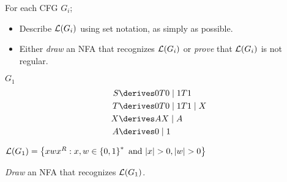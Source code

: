 \begin{problem}
  For each CFG $G_i$;
  \begin{itemize}
    \item Describe $\mathcal{L}(G_i)$ using set notation, as simply as possible.
    \item Either \emph{draw} an NFA that recognizes $\mathcal{L}(G_i)$ or
      \emph{prove} that $\mathcal{L}(G_i)$ is not regular.
  \end{itemize}

  \begin{enumalph}
    \item $G_1$
      \begin{align*}
        S &\derives 0T0 \mid 1T1 \\
        T &\derives 0T0 \mid 1T1 \mid X \\
        X &\derives AX \mid A \\
        A &\derives 0 \mid 1
      \end{align*}
      \begin{Answer}
        \begin{enumroman}
          \item $\mathcal{L}(G_1) = \left\{xwx^R : x, w \in \left\{0, 1\right\}^* \text{ and } \lvert x\rvert > 0, \lvert w\rvert > 0\right\}$
          \item \emph{Draw} an NFA that recognizes $\mathcal{L}(G_1)$.
          
          \begin{figure}[H]
\end{figure}
\end{enumroman}
\end{Answer}
\end{enumalph}
\end{problem}
